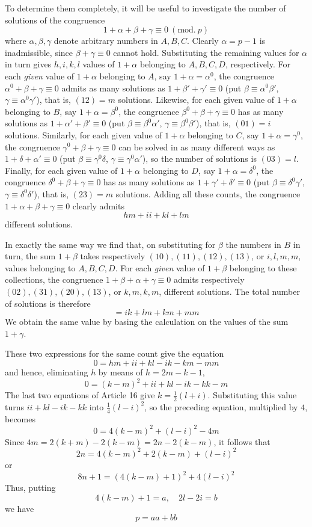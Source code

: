 To determine them completely, it will be useful to investigate the number of solutions of the congruence
\[
1+\alpha+\beta+\gamma\equiv0\ (\mathrm{mod.}\ p)
\]
where $\alpha,\beta,\gamma$ denote arbitrary numbers in $A,B,C$. Clearly $\alpha=p-1$ is inadmissible, since $\beta+\gamma\equiv0$ cannot hold. Substituting the remaining values for $\alpha$ in turn gives $h,i,k,l$ values of $1+\alpha$ belonging to $A,B,C,D$, respectively. For each \emph{given} value of $1+\alpha$ belonging to $A$, say $1+\alpha=\alpha^0$, the congruence $\alpha^0+\beta+\gamma\equiv0$ admits as many solutions as $1+\beta'+\gamma'\equiv0$ (put $\beta\equiv\alpha^0\beta'$, $\gamma\equiv\alpha^0\gamma'$), that is, $(12)=m$ solutions. Likewise, for each given value of $1+\alpha$ belonging to $B$, say $1+\alpha=\beta^0$, the congruence $\beta^0+\beta+\gamma\equiv0$ has as many solutions as $1+\alpha'+\beta'\equiv0$ (put $\beta\equiv\beta^0\alpha'$, $\gamma\equiv\beta^0\beta'$), that is, $(01)=i$ solutions. Similarly, for each given value of $1+\alpha$ belonging to $C$, say $1+\alpha=\gamma^0$, the congruence $\gamma^0+\beta+\gamma\equiv0$ can be solved in as many different ways as $1+\delta+\alpha'\equiv0$ (put $\beta\equiv\gamma^0\delta$, $\gamma\equiv\gamma^0\alpha'$), so the number of solutions is $(03)=l$. Finally, for each given value of $1+\alpha$ belonging to $D$, say $1+\alpha=\delta^0$, the congruence $\delta^0+\beta+\gamma\equiv0$ has as many solutions as $1+\gamma'+\delta'\equiv0$ (put $\beta\equiv\delta^0\gamma'$, $\gamma\equiv\delta^0\delta'$), that is, $(23)=m$ solutions. Adding all these counts, the congruence $1+\alpha+\beta+\gamma\equiv0$ clearly admits
\[
hm+ii+kl+lm
\]
different solutions.

In exactly the same way we find that, on substituting for $\beta$ the numbers in $B$ in turn, the sum $1+\beta$ takes respectively $(10),(11),(12),(13)$, or $i,l,m,m$, values belonging to $A,B,C,D$. For each \emph{given} value of $1+\beta$ belonging to these collections, the congruence $1+\beta+\alpha+\gamma\equiv0$ admits respectively $(02),(31),(20),(13)$, or $k,m,k,m$, different solutions. The total number of solutions is therefore
%
\[
=ik+lm+km+mm
\]
We obtain the same value by basing the calculation on the values of the sum $1+\gamma$.

These two expressions for the same count give the equation
\[
0=hm+ii+kl-ik-km-mm
\]
and hence, eliminating $h$ by means of $h=2m-k-1$,
\[
0=(k-m)^2+ii+kl-ik-kk-m
\]
The last two equations of Article 16 give $k=\frac12(l+i)$. Substituting this value turns $ii+kl-ik-kk$ into $\frac14(l-i)^2$, so the preceding equation, multiplied by $4$, becomes
\[
0=4(k-m)^2+(l-i)^2-4m
\]
Since $4m=2(k+m)-2(k-m)=2n-2(k-m)$, it follows that
\[
2n=4(k-m)^2+2(k-m)+(l-i)^2
\]
or
\[
8n+1=(4(k-m)+1)^2+4(l-i)^2
\]
Thus, putting
\[
4(k-m)+1=a,\quad2l-2i=b
\]
we have
\[
p=aa+bb
\]

